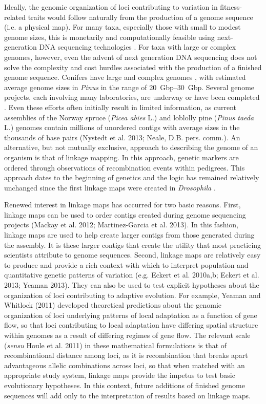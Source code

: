 \documentclass[11pt]{article}
\begin{document}
Ideally, the genomic organization of loci contributing to variation in fitness-related traits would follow 
naturally from the production of a genome sequence (i.e. a physical map). For many taxa, especially those with 
small to modest genome sizes, this is monetarily and computationally feasible using next-generation DNA sequencing 
technologies \citep{Koboldt:2013}. For taxa with large or complex genomes, however, even the advent of next generation DNA 
sequencing does not solve the complexity and cost hurdles associated with the production of a finished genome sequence. Conifers have large and 
complex genomes \citep{Murray:1998, Ahuja:2005}, with estimated average genome sizes in \textit{Pinus} in the 
range of \SIrange{20}{30}{Gbp}. Several genome projects, each involving many laboratories, are underway or have been 
completed \citep{Mackay:2012, Nystedt:2013}. Even these efforts often initially result in limited information, 
as current assemblies of the Norway spruce (\textit{Picea abies} L.) and loblolly pine (\textit{Pinus taeda} L.) genomes 
contain millions of unordered contigs with average sizes in the thousands of base pairs (Nystedt et al. 2013; 
Neale, D.B. pers. comm.). An alternative, but not mutually exclusive, approach to describing the genome of an organism 
is that of linkage mapping. In this approach, genetic markers are ordered through observations of recombination events 
within pedigrees. This approach dates to the beginning of genetics and the logic has remained relatively unchanged 
since the first linkage maps were created in \textit{Drosophila} \citep{Sturtevant:1913}.

Renewed interest in linkage maps has occurred for two basic reasons. First, linkage maps can be used to order contigs 
created during genome sequencing projects (Mackay et al. 2012; Martinez-Garcia et al. 2013). In this fashion, linkage 
maps are used to help create larger contigs from those generated during the assembly. It is these larger contigs that 
create the utility that most practicing scientists attribute to genome sequences. Second, linkage maps are relatively 
easy to produce and provide a rich context with which to interpret population and quantitative genetic patterns of variation 
(e.g. Eckert et al. 2010a,b; Eckert et al. 2013; Yeaman 2013). They can also be used to test explicit hypotheses about 
the organization of loci contributing to adaptive evolution. For example, Yeaman and Whitlock (2011) developed theoretical 
predictions about the genomic organization of loci underlying patterns of local adaptation as a function of gene flow, 
so that loci contributing to local adaptation have differing spatial structure within genomes as a result of differing 
regimes of gene flow. The relevant scale (\textit{sensu} Houle et al. 2011) in these mathematical formulations is that 
of recombinational distance among loci, as it is recombination that breaks apart advantageous allelic combinations across 
loci, so that when matched with an appropriate study system, linkage maps provide the impetus to test basic evolutionary 
hypotheses. In this context, future additions of finished genome sequences will add only to the interpretation of 
results based on linkage maps.
\end{document}

